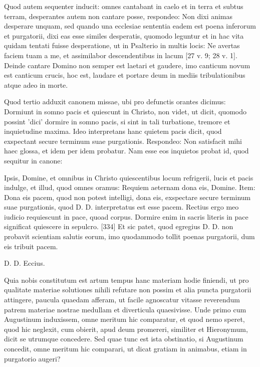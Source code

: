 Quod autem sequenter inducit: omnes cantabant in caelo et in terra et subtus terram, desperantes autem non cantare posse, respondeo: Non dixi animas desperare unquam, sed quando una ecclesiae sententia eadem est poena inferorum et purgatorii, dixi eas esse similes desperatis, quomodo leguntur et in hac vita quidam tentati fuisse desperatione, ut in Psalterio in multis locis: Ne avertas faciem tuam a me, et assimilabor descendentibus in lacum [27 v. 9; 28 v. 1]. Deinde cantare Domino non semper est laetari et gaudere, imo canticum novum est canticum crucis, hoc est, laudare et portare deum in mediis tribulationibus atque adeo in morte.

Quod tertio adduxit canonem missae, ubi pro defunctis orantes dicimus: Dormiunt in somno pacis et quiescunt in Christo, non videt, ut dicit, quomodo possint 'dici' dormire in somno pacis, si sint in tali turbatione, tremore et inquietudine maxima. Ideo interpretans hanc quietem pacis dicit, quod exspectant secure terminum suae purgationis. Respondeo: Non satisfacit mihi haec glossa, et idem per idem probatur. Nam esse eos inquietos probat id, quod sequitur in canone:

Ipsis, Domine, et omnibus in Christo quiescentibus locum refrigerii, lucis et pacis indulge, et illud, quod omnes oramus: Requiem aeternam dona eis, Domine. Item: Dona eis pacem, quod non potest intelligi, dona eis, exspectare secure terminum suae purgationis, quod D. D. interpretatus est esse pacem. Rectius ergo meo iudicio requiescunt in pace, quoad corpus. Dormire enim in sacris literis in pace significat quiescere in sepulcro. [334] Et sic patet, quod egregius D. D. non probavit scientiam salutis eorum, imo quodammodo tollit poenas purgatorii, dum eis tribuit pacem.

D. D. Eccius.

Quia nobis constitutum est artum tempus hanc materiam hodie finiendi, ut pro qualitate materiae solutiones nihili refutare non possim et alia puncta purgatorii attingere, paucula quaedam afferam, ut facile agnoscatur vitasse reverendum patrem materiae nostrae medullam et diverticula quaesivisse. Unde primo cum Augustinum induxissem, omne meritum hic comparatur, et quod nemo speret, quod hic neglexit, cum obierit, apud deum promereri, similiter et Hieronymum, dicit se utrumque concedere. Sed quae tunc est ista obstinatio, si Augustinum concedit, omne meritum hic comparari, ut dicat gratiam in animabus, etiam in purgatorio augeri?

